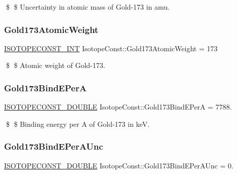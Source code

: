 \$ \$ Uncertainty in atomic mass of Gold-\/173 in amu. \mbox{\label{group___isotope_const-_gold-_au173_ga32a7bfaba1698303cc8fb36586818670}} 
\subsubsection{\texorpdfstring{Gold173\+Atomic\+Weight}{Gold173AtomicWeight}}
{\footnotesize\ttfamily \mbox{\hyperlink{group___isotope_const-_macros_ga5f18360b3e99483a35c32d789e62621c}{I\+S\+O\+T\+O\+P\+E\+C\+O\+N\+S\+T\+\_\+\+I\+NT}} Isotope\+Const\+::\+Gold173\+Atomic\+Weight = 173}

\$ \$ Atomic weight of Gold-\/173. \mbox{\label{group___isotope_const-_gold-_au173_ga862f1ae0231e0f6fdccc0ea52f0495a4}} 
\subsubsection{\texorpdfstring{Gold173\+Bind\+E\+PerA}{Gold173BindEPerA}}
{\footnotesize\ttfamily \mbox{\hyperlink{group___isotope_const-_macros_ga8f45a7272ce02c0b4c65c44636ed719a}{I\+S\+O\+T\+O\+P\+E\+C\+O\+N\+S\+T\+\_\+\+D\+O\+U\+B\+LE}} Isotope\+Const\+::\+Gold173\+Bind\+E\+PerA = 7788.}

\$ \$ Binding energy per A of Gold-\/173 in keV. \mbox{\label{group___isotope_const-_gold-_au173_ga705c62fba0287fdc347f9fa163106cac}} 
\subsubsection{\texorpdfstring{Gold173\+Bind\+E\+Per\+A\+Unc}{Gold173BindEPerAUnc}}
{\footnotesize\ttfamily \mbox{\hyperlink{group___isotope_const-_macros_ga8f45a7272ce02c0b4c65c44636ed719a}{I\+S\+O\+T\+O\+P\+E\+C\+O\+N\+S\+T\+\_\+\+D\+O\+U\+B\+LE}} Isotope\+Const\+::\+Gold173\+Bind\+E\+Per\+A\+Unc = 0.}


